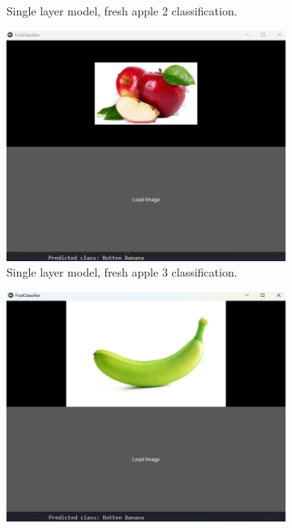 \documentclass[conference]{IEEEtran}
\begin{document}
\begin{figure}[h]
\begin{subfigure}[b]{0.48\linewidth}
        \caption{Single layer model, fresh apple 2 classification.}
        \label{figFB}
    \end{subfigure}
    \hfill
    \begin{subfigure}[b]{0.48\linewidth}
        \centering
        \includegraphics[width=\linewidth]{1layer appel3.png}
        \caption{Single layer model, fresh apple 3 classification.}
        \label{figFB}
    \end{subfigure}
    \hfill
    \begin{subfigure}[b]{0.48\linewidth}
        \centering
        \includegraphics[width=\linewidth]{1layer banana1.png}

\end{subfigure}
\end{figure}
\end{document}
